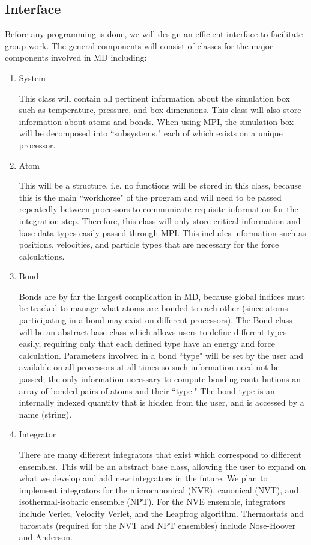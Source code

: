 \documentclass[10pt]{article}
\begin{document}
\subsection{Interface}
Before any programming is done, we will design an efficient interface to facilitate group work. The general components will consist of classes for the major components involved in MD including:
\begin{enumerate}
	\item{System} \par This class will contain all pertinent information about the simulation box such as temperature, pressure, and box dimensions.  This class will also store information about atoms and bonds.  When using MPI, the simulation box will be decomposed into ``subsystems," each of which exists on a unique processor. %
	\item{Atom} \par This will be a structure, i.e. no functions will be stored in this class, because this is the main ``workhorse" of the program and will need to be passed repeatedly between processors to communicate requisite information for the integration step.  Therefore, this class will only store critical information and base data types easily passed through MPI.  This includes information such as positions, velocities, and particle types that are necessary for the force calculations.
	\item{Bond} \par Bonds are by far the largest complication in MD, because global indices must be tracked to manage what atoms are bonded to each other (since atoms participating in a bond may exist on different processors).  The Bond class will be an abstract base class which allows users to define different types easily, requiring only that each defined type have an energy and force calculation.  Parameters involved in a bond ``type" will be set by the user and available on all processors at all times so such information need not be passed; the only information necessary to compute bonding contributions an array of bonded pairs of atoms and their ``type."  The bond type is an internally indexed quantity that is hidden from the user, and is accessed by a name (string).
	\item{Integrator} \par There are many different integrators that exist which correspond to different ensembles.  This will be an abstract base class, allowing the user to expand on what we develop and add new integrators in the future.  We plan to implement integrators for the microcanonical  (NVE), canonical (NVT), and isothermal-isobaric ensemble (NPT).  For the NVE ensemble, integrators include Verlet, Velocity Verlet, and the Leapfrog algorithm.  Thermostats and barostats (required for the NVT and NPT ensembles) include Nose-Hoover and Anderson.

\end{enumerate}
\end{document}
